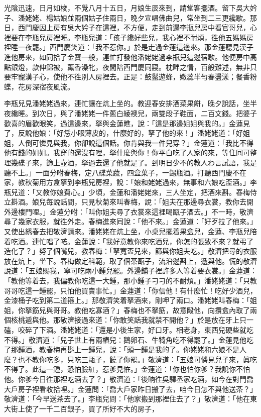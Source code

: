 光陰迅速，日月如梭，不覺八月十五日，月娘生辰來到，請堂客擺酒。留下吳大妗子、潘姥姥、楊姑娘並兩個姑子住兩日，晚夕宣唱佛曲兒，常坐到二三更纔歇。那日，西門慶因上房有吳大妗子在這裡，不方便，走到前邊李瓶兒房中看官哥兒，心裡要在李瓶兒房裡睡。李瓶兒道：「孩子纔好些兒，我心裡不耐煩，徃他五媽媽房裡睡一夜罷。」{}西門慶笑道：「我不惹你。」於是走過金蓮這邊來。那金蓮聽見漢子進他房來，如同拾了金寶一般，連忙打發他潘姥姥過李瓶兒這邊宿歇。他便房中高點銀燈，款伸錦被，薰香澡牝，夜間陪西門慶同寢。枕畔之情，百般難述，無非只要牢寵漢子心，使他不徃別人房裡去。正是：鼓鬣遊蜂，嫩蕊半勻春盪漾；餐香粉蝶，花房深宿夜風流。

李瓶兒見潘姥姥過來，連忙讓在炕上坐的。教迎春安排酒菜果餅，晚夕說話，坐半夜纔睡。到次日，與了潘姥姥一件蔥白綾襖兒，兩雙段子鞋面，二百文錢。把婆子歡喜的眉歡眼笑，過這邊來，拏與金蓮瞧，說：「這是那邊姐姐與我的。」金蓮見了，反說他娘：「好恁小眼薄皮的，什麼好的，拏了他的來！」潘姥姥道：「好姐姐，人倒可憐見與我，你卻說這個話。你肯與我一件兒穿？」金蓮道：「我比不得他有錢的姐姐。我穿的還沒有哩，拏什麼與你！你平白吃了人家的來，等住囘可整理幾碟子來，篩上壺酒，拏過去還了他就是了。到明日少不的教人わ言試語，我是聽不上。」{}一面分咐春梅，定八碟菜蔬，四盒菓子，一錫瓶酒。打聽西門慶不在家，教秋菊用方盒拏到李瓶兒房裡，說：「娘和姥姥過來，無事和六娘吃盃酒。」李瓶兒道：「又教你娘費心。」少頃，金蓮和潘姥姥來，三人坐定，把酒來斟。春梅侍立斟酒。娘兒每說話間，只見秋菊來叫春梅，說：「姐夫在那邊尋衣裳，教你去開外邊樓門哩。」金蓮分咐：「叫你姐夫尋了衣裳來這裡喝甌子酒去。」不一時，敬濟尋了幾家衣服，就徃外走。春梅進來囘說：「他不來。」金蓮道：「好歹拉了他來。」又使出綉春去把敬濟請來。潘姥姥在炕上坐，小桌兒擺着果盒兒，金蓮、李瓶兒陪着吃酒。連忙唱了喏。金蓮說：「我好意教你來吃酒兒，你怎的張致不來？就弔了造化了？」努了個嘴兒，教春梅：「拏寬盃兒來，篩與你姐夫吃。」敬濟把尋的衣服放在炕上，坐下。春梅做定科範，取了個茶甌子，流沿邊斟上，遞與他。慌的敬濟說道：「五娘賜我，寧可吃兩小鍾兒罷。外邊鋪子裡許多人等着要衣裳。」金蓮道：「教他等着去，我偏教你吃這一大鍾，那小鍾子刁刁的不耐煩。」潘姥姥道：「只教哥哥吃這一鍾罷，只怕他買賣事忙。」金蓮道：「你信他！有什麼忙！吃好少酒兒，金漆桶子吃到第二道箍上。」那敬濟笑着拏酒來，剛呷了兩口。潘姥姥叫春梅：「姐姐，你拏筯兒與哥哥。教他吃寡酒？」春梅也不拏筯，故意毆他，向攢盒內取了兩個核桃遞與他。{}那敬濟接過來道：「你敢笑話我就禁不開他？」於是放在牙上只一磕，咬碎了下酒。潘姥姥道：「還是小後生家，好口牙。相老身，東西兒硬些就吃不得。」敬濟道：「兒子世上有兩樁兒：鵝卵石、牛犄角吃不得罷了。」金蓮見他吃了那鍾酒，教春梅再斟上一鍾兒，說：「頭一鍾是我的了。你姥姥和六娘不是人麼？也不教你吃多，只吃三甌子，饒了你罷。」敬濟道：「五娘可憐見兒子來，眞吃不得了。此這一鍾，恐怕臉紅，惹爹見恠。」金蓮道：「你也怕你爹？我說你不怕他。{}你爹今日徃那裡吃酒去了？」敬濟道：「後晌徃吳驛丞家吃酒，如今在對門喬大戶房子裡看收拾哩。」金蓮問：「喬大戶家昨日搬了去，咱今日怎不與他送茶？」敬濟道：「今早送茶去了。」李瓶兒問：「他家搬到那裡住去了？」敬濟道：「他在東大街上使了一千二百銀子，買了所好不大的房子，